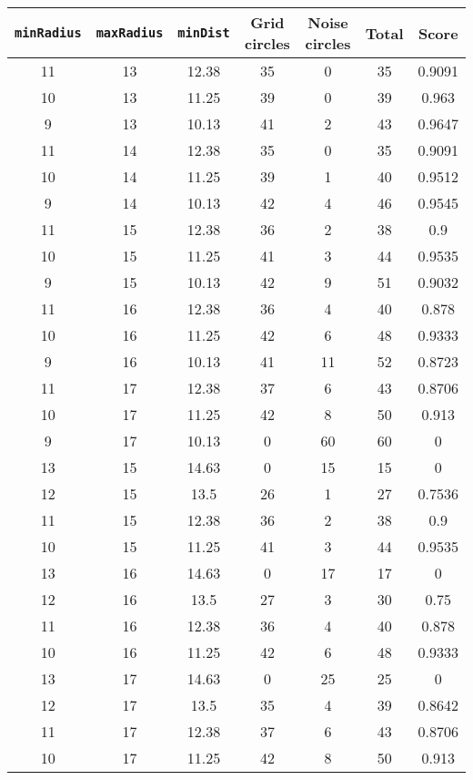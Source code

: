 \documentclass[letterpaper, 12pt]{article}
\begin{document}
\begin{longtable}{|c|c|c|c|c|c|c|}
\hline
\textbf{\texttt{minRadius}} & \textbf{\texttt{maxRadius}} & \textbf{\texttt{minDist}} & \textbf{Grid circles} & \textbf{Noise circles} & \textbf{Total} & \textbf{Score} \\
\hline
11 & 13 & 12.38 & 35 & 0 & 35 & 0.9091 \\
\hline
10 & 13 & 11.25 & 39 & 0 & 39 & 0.963 \\
\hline
9 & 13 & 10.13 & 41 & 2 & 43 & 0.9647 \\
\hline
11 & 14 & 12.38 & 35 & 0 & 35 & 0.9091 \\
\hline
10 & 14 & 11.25 & 39 & 1 & 40 & 0.9512 \\
\hline
9 & 14 & 10.13 & 42 & 4 & 46 & 0.9545 \\
\hline
11 & 15 & 12.38 & 36 & 2 & 38 & 0.9 \\
\hline
10 & 15 & 11.25 & 41 & 3 & 44 & 0.9535 \\
\hline
9 & 15 & 10.13 & 42 & 9 & 51 & 0.9032 \\
\hline
11 & 16 & 12.38 & 36 & 4 & 40 & 0.878 \\
\hline
10 & 16 & 11.25 & 42 & 6 & 48 & 0.9333 \\
\hline
9 & 16 & 10.13 & 41 & 11 & 52 & 0.8723 \\
\hline
11 & 17 & 12.38 & 37 & 6 & 43 & 0.8706 \\
\hline
10 & 17 & 11.25 & 42 & 8 & 50 & 0.913 \\
\hline
9 & 17 & 10.13 & 0 & 60 & 60 & 0 \\
\hline
13 & 15 & 14.63 & 0 & 15 & 15 & 0 \\
\hline
12 & 15 & 13.5 & 26 & 1 & 27 & 0.7536 \\
\hline
11 & 15 & 12.38 & 36 & 2 & 38 & 0.9 \\
\hline
10 & 15 & 11.25 & 41 & 3 & 44 & 0.9535 \\
\hline
13 & 16 & 14.63 & 0 & 17 & 17 & 0 \\
\hline
12 & 16 & 13.5 & 27 & 3 & 30 & 0.75 \\
\hline
11 & 16 & 12.38 & 36 & 4 & 40 & 0.878 \\
\hline
10 & 16 & 11.25 & 42 & 6 & 48 & 0.9333 \\
\hline
13 & 17 & 14.63 & 0 & 25 & 25 & 0 \\
\hline
12 & 17 & 13.5 & 35 & 4 & 39 & 0.8642 \\
\hline
11 & 17 & 12.38 & 37 & 6 & 43 & 0.8706 \\
\hline
10 & 17 & 11.25 & 42 & 8 & 50 & 0.913 \\

\end{longtable}
\end{document}
